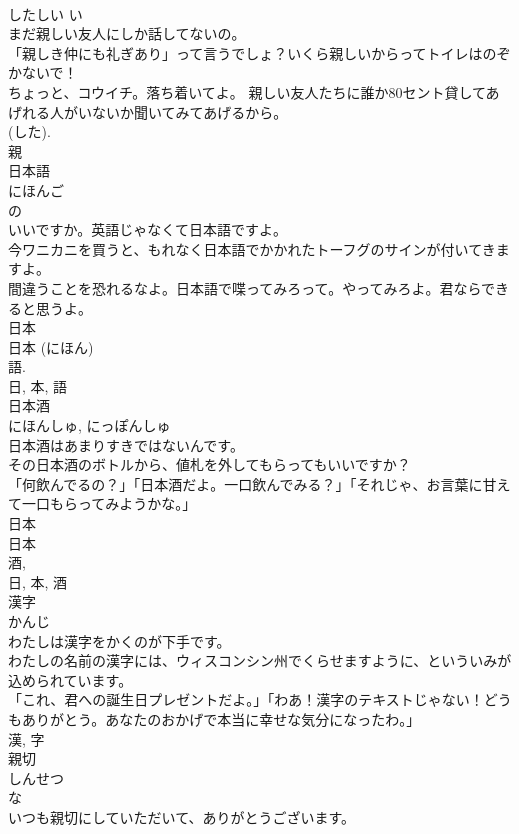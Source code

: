 \documentclass[8pt]{extreport}
\begin{document}
\begin{CJK}{UTF8}{min}
\\	したしい	い 
\\	まだ親しい友人にしか話してないの。	
\\	「親しき仲にも礼ぎあり」って言うでしょ？いくら親しいからってトイレはのぞかないで！	
\\	ちょっと、コウイチ。落ち着いてよ。 親しい友人たちに誰か80セント貸してあげれる人がいないか聞いてみてあげるから。	
\\	(した). 
\\	親	
\\	日本語	
\\	にほんご	
\\	の 
\\	いいですか。英語じゃなくて日本語ですよ。	
\\	今ワニカニを買うと、もれなく日本語でかかれたトーフグのサインが付いてきますよ。	
\\	間違うことを恐れるなよ。日本語で喋ってみろって。やってみろよ。君ならできると思うよ。	
\\	日本 
\\	日本 (にほん) 
\\	語. 
\\	日, 本, 語	
\\	日本酒	
\\	にほんしゅ, にっぽんしゅ	
\\	日本酒はあまりすきではないんです。	
\\	その日本酒のボトルから、値札を外してもらってもいいですか？	
\\	「何飲んでるの？」「日本酒だよ。一口飲んでみる？」「それじゃ、お言葉に甘えて一口もらってみようかな。」	
\\	日本 
\\	日本
\\	酒, 
\\	日, 本, 酒	
\\	漢字	
\\	かんじ	
\\	わたしは漢字をかくのが下手です。	
\\	わたしの名前の漢字には、ウィスコンシン州でくらせますように、といういみが込められています。	
\\	「これ、君への誕生日プレゼントだよ。」「わあ！漢字のテキストじゃない！どうもありがとう。あなたのおかげで本当に幸せな気分になったわ。」	
\\	漢, 字	
\\	親切	
\\	しんせつ	
\\	な 
\\	いつも親切にしていただいて、ありがとうございます。	

\end{CJK}
\end{document}
